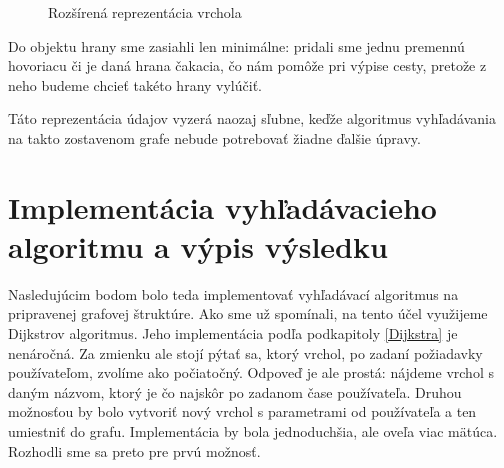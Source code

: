 \begin{figure}[H]
  \caption{Rozšírená reprezentácia vrchola}
  \label{2_Vertex}
\end{figure}

Do objektu hrany sme zasiahli len minimálne: pridali sme jednu premennú hovoriacu či je daná hrana čakacia, čo nám pomôže pri výpise cesty, pretože z neho budeme chcieť takéto hrany vylúčiť.\newline

Táto reprezentácia údajov vyzerá naozaj sľubne, keďže algoritmus vyhľadávania na takto zostavenom grafe nebude potrebovať žiadne ďalšie úpravy.\newline


\section{Implementácia vyhľadávacieho algoritmu a výpis výsledku}

Nasledujúcim bodom bolo teda implementovať vyhľadávací algoritmus na pripravenej grafovej štruktúre. Ako sme už spomínali, na tento účel využijeme Dijkstrov algoritmus. Jeho implementácia podľa podkapitoly \ref{Dijkstra} je nenáročná. Za zmienku ale stojí pýtať sa, ktorý vrchol, po zadaní požiadavky používateľom, zvolíme ako počiatočný. Odpoveď je ale prostá: nájdeme vrchol s daným názvom, ktorý je čo najskôr po zadanom čase používateľa. Druhou možnosťou by bolo vytvoriť nový vrchol s parametrami od používateľa a ten umiestniť do grafu. Implementácia by bola jednoduchšia, ale oveľa viac mätúca. Rozhodli sme sa preto pre prvú možnosť.\newline


